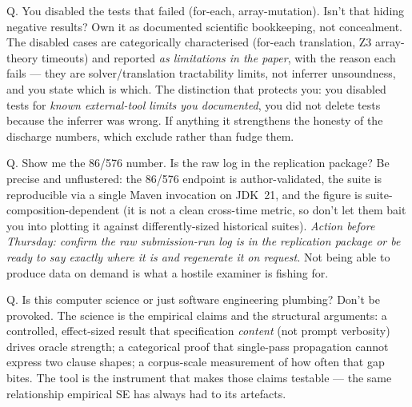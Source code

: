 \documentclass[11pt]{article}
\begin{document}
\begin{qbox}{Q. You disabled the tests that failed (for-each, array-mutation). Isn't that hiding negative results?}
Own it as documented scientific bookkeeping, not concealment. The disabled
cases are categorically characterised (for-each translation, Z3 array-theory
timeouts) and reported \emph{as limitations in the paper}, with the reason each
fails --- they are solver/translation tractability limits, not inferrer
unsoundness, and you state which is which. The distinction that protects you:
you disabled tests for \emph{known external-tool limits you documented}, you did
not delete tests because the inferrer was wrong. If anything it strengthens the
honesty of the discharge numbers, which exclude rather than fudge them.
\end{qbox}

\begin{qbox}{Q. Show me the 86/576 number. Is the raw log in the replication package?}
Be precise and unflustered: the 86/576 endpoint is author-validated, the suite
is reproducible via a single Maven invocation on JDK~21, and the figure is
suite-composition-dependent (it is not a clean cross-time metric, so don't let
them bait you into plotting it against differently-sized historical suites).
\emph{Action before Thursday: confirm the raw submission-run log is in the
replication package or be ready to say exactly where it is and regenerate it on
request.} Not being able to produce data on demand is what a hostile examiner
is fishing for.
\end{qbox}

\begin{qbox}{Q. Is this computer science or just software engineering plumbing?}
Don't be provoked. The science is the empirical claims and the structural
arguments: a controlled, effect-sized result that specification \emph{content}
(not prompt verbosity) drives oracle strength; a categorical proof that
single-pass propagation cannot express two clause shapes; a corpus-scale
measurement of how often that gap bites. The tool is the instrument that makes
those claims testable --- the same relationship empirical SE has always had to
its artefacts.
\end{qbox}
\end{document}
